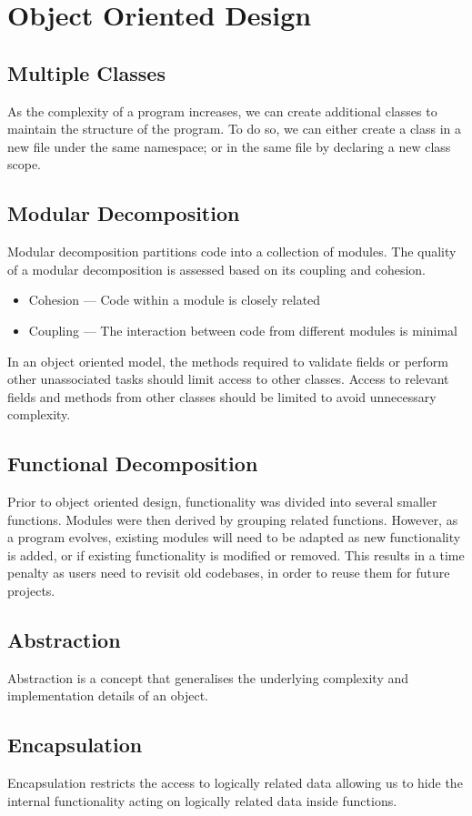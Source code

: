 \documentclass{article}
\begin{document}
\section{Object Oriented Design}
\subsection{Multiple Classes}
As the complexity of a program increases, we can create additional
classes to maintain the structure of the program. To do so, we can
either create a class in a new file under the same namespace; or in the
same file by declaring a new class scope.
\subsection{Modular Decomposition}
Modular decomposition partitions code into a collection of modules. The
quality of a modular decomposition is assessed based on its coupling
and cohesion.
\begin{itemize}
    \item Cohesion --- Code within a module is closely related
    \item Coupling --- The interaction between code from different
          modules is minimal
\end{itemize}
In an object oriented model, the methods required to validate fields or perform other
unassociated tasks should limit access to other classes.
Access to relevant fields and methods from other classes should be
limited to avoid unnecessary complexity.
\subsection{Functional Decomposition}
Prior to object oriented design, functionality was divided into several
smaller functions. Modules were then derived by grouping related
functions. However, as a program evolves, existing modules will need to
be adapted as new functionality is added, or if existing functionality
is modified or removed. This results in a time penalty as users need to
revisit old codebases, in order to reuse them for future projects.
\subsection{Abstraction}
Abstraction is a concept that generalises the underlying complexity and
implementation details of an object.
\subsection{Encapsulation}
Encapsulation restricts the access to logically related data allowing
us to hide the internal \linebreak functionality acting on logically
related data inside functions.
\end{document}
